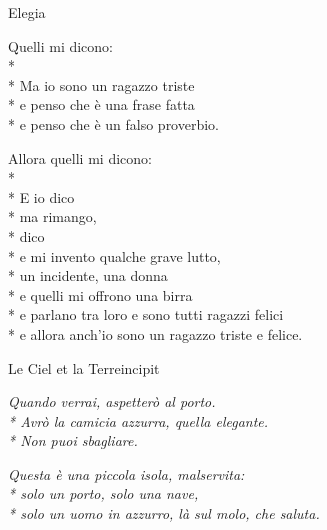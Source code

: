 \documentclass[12pt]{book}
\begin{document}
\begin{poem}{Elegia}{}
\begin{changemargin}{-1cm}{-2cm}
\begin{altverse}
Quelli mi dicono:\\*
\\*
Ma io sono un ragazzo triste\\*
e penso che è una frase fatta\\*
e penso che è un falso proverbio.
\end{altverse}


\begin{altverse}
Allora quelli mi dicono:\\*
\\*
E io dico \\*
ma rimango,\\*
 dico\\*
e mi invento qualche grave lutto,\\*
un incidente, una donna\\*
e quelli mi offrono una birra\\*
e parlano tra loro e sono tutti ragazzi felici\\*
e allora anch'io sono un ragazzo triste e felice.
\end{altverse}
\end{changemargin}
\end{poem}

\begin{poem}{Le Ciel et la Terre}{incipit}

\settowidth{\versewidth}{non meno è ciò che meriti.}
\begin{changemargin}{-1cm}{-2cm} 
\begin{altverse}
\incipit{}
\textit{\quad \qquad Quando verrai, aspetterò al porto. \\*
Avrò la camicia azzurra, quella elegante. \\*
Non puoi sbagliare.}
\end{altverse}

\begin{altverse}
\textit{Questa è una piccola isola, malservita:\\*
solo un porto, solo una nave, \\*
solo un uomo in azzurro, là sul molo, che saluta.}
\end{altverse}
\end{changemargin}
\end{poem}
\end{document}
